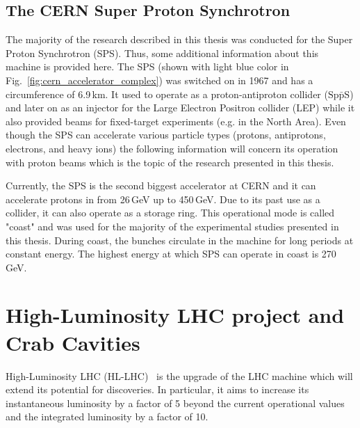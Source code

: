  \subsection{The CERN Super Proton Synchrotron}
 The majority of the research described in this thesis was conducted for the Super Proton Synchrotron (SPS). Thus, some additional information about this machine is provided here. The SPS (shown with light blue color in Fig.~\ref{fig:cern_accelerator_complex}) was switched on in 1967 and has a circumference of 6.9\,km. It used to operate as a proton-antiproton collider ($\mathrm{Sp\bar{p}S}$) and later on as an injector for the Large Electron Positron collider (LEP) while it also provided beams for fixed-target experiments (e.g. in the North Area). Even though the SPS can accelerate various particle types (protons, antiprotons, electrons, and heavy ions) the following information will concern its operation with proton beams which is the topic of the research presented in this thesis.

 Currently, the SPS is the second biggest accelerator at CERN and it can accelerate protons in from 26\,GeV up to 450\,GeV. Due to its past use as a collider, it can also operate as a storage ring. This operational mode is called "coast" and was used for the majority of the experimental studies presented in this thesis. During coast, the bunches circulate in the machine for long periods at constant energy. The highest energy at which SPS can operate in coast is 270\,GeV. 

 



\section{High-Luminosity LHC project and Crab Cavities}
High-Luminosity LHC (HL-LHC)~\cite{HL_LHC_yellow_report, Brning2015} is the upgrade of the LHC machine which will extend its potential for discoveries. In particular, it aims to increase its instantaneous luminosity by a factor of 5 beyond the current operational values and the integrated luminosity by a factor of 10. 

